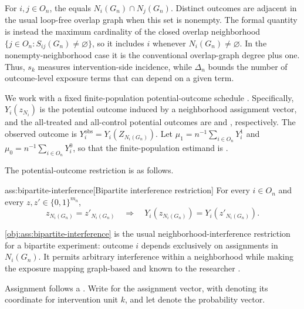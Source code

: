 For \(i,j\in O_n\), the  equals \(N_i(G_n)\cap N_j(G_n)\). Distinct outcomes are adjacent in the usual loop-free overlap graph when this set is nonempty. The formal quantity  is instead the maximum cardinality of the closed overlap neighborhood \(\{j\in O_n:S_{ij}(G_n)\neq\varnothing\}\), so it includes \(i\) whenever \(N_i(G_n)\neq\varnothing\). In the nonempty-neighborhood case it is the conventional overlap-graph degree plus one. Thus, \(s_k\) measures intervention-side incidence, while \(\Delta_n\) bounds the number of outcome-level exposure terms that can depend on a given term.

We work with a fixed finite-population potential-outcome schedule . Specifically, \(Y_i(z_{N_i})\) is the potential outcome induced by a neighborhood assignment vector, and the all-treated and all-control potential outcomes are  and , respectively. The observed outcome is \(Y_i^{\mathrm{obs}}=Y_i(Z_{N_i(G_n)})\). Let \(\mu_1=n^{-1}\sum_{i\in O_n}Y_i^1\) and \(\mu_0=n^{-1}\sum_{i\in O_n}Y_i^0\), so that the finite-population estimand is .

The potential-outcome restriction is as follows.

\begin{assumptionv}{ass:bipartite-interference}[Bipartite interference restriction]
For every $i\in O_n$ and every $z,z'\in\{0,1\}^{m_n}$,
\[
z_{N_i(G_n)}=z'_{N_i(G_n)}
\quad\Longrightarrow\quad
Y_i\!\left(z_{N_i(G_n)}\right)=Y_i\!\left(z'_{N_i(G_n)}\right).
\]
\end{assumptionv}

\cref{obj:ass:bipartite-interference} is the usual neighborhood-interference restriction for a bipartite experiment: outcome \(i\) depends exclusively on assignments in \(N_i(G_n)\). It permits arbitrary interference within a neighborhood while making the exposure mapping graph-based and known to the researcher \citep{LuShiFangZhangDing2025BipartiteDesign}.

Assignment follows a . Write  for the assignment vector, with  denoting its coordinate for intervention unit \(k\), and let  denote the probability vector.

